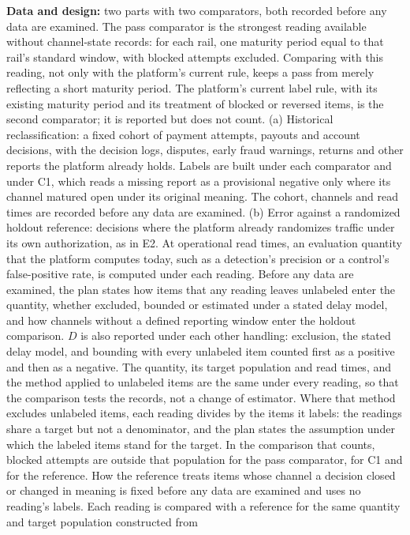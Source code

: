 \documentclass[
  11pt,
]{article}
\begin{document}
\textbf{Data and design:} two parts with two comparators, both recorded
before any data are examined. The pass comparator is the strongest
reading available without channel-state records: for each rail, one
maturity period equal to that rail's standard window, with blocked
attempts excluded. Comparing with this reading, not only with the
platform's current rule, keeps a pass from merely reflecting a short
maturity period. The platform's current label rule, with its existing
maturity period and its treatment of blocked or reversed items, is the
second comparator; it is reported but does not count. (a) Historical
reclassification: a fixed cohort of payment attempts, payouts and
account decisions, with the decision logs, disputes, early fraud
warnings, returns and other reports the platform already holds. Labels
are built under each comparator and under C1, which reads a missing
report as a provisional negative only where its channel matured open
under its original meaning. The cohort, channels and read times are
recorded before any data are examined. (b) Error against a randomized
holdout reference: decisions where the platform already randomizes
traffic under its own authorization, as in E2. At operational read
times, an evaluation quantity that the platform computes today, such as
a detection's precision or a control's false-positive rate, is computed
under each reading. Before any data are examined, the plan states how
items that any reading leaves unlabeled enter the quantity, whether
excluded, bounded or estimated under a stated delay model, and how
channels without a defined reporting window enter the holdout
comparison. \(D\) is also reported under each other handling: exclusion,
the stated delay model, and bounding with every unlabeled item counted
first as a positive and then as a negative. The quantity, its target
population and read times, and the method applied to unlabeled items are
the same under every reading, so that the comparison tests the records,
not a change of estimator. Where that method excludes unlabeled items,
each reading divides by the items it labels: the readings share a target
but not a denominator, and the plan states the assumption under which
the labeled items stand for the target. In the comparison that counts,
blocked attempts are outside that population for the pass comparator,
for C1 and for the reference. How the reference treats items whose
channel a decision closed or changed in meaning is fixed before any data
are examined and uses no reading's labels. Each reading is compared with
a reference for the same quantity and target population constructed from
\end{document}
